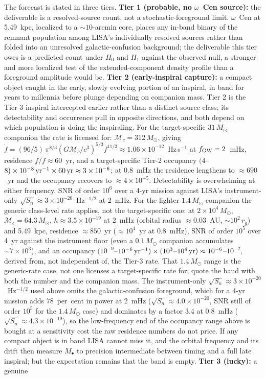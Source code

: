 \documentclass[11pt]{article}
\newcommand{\msun}{\ensuremath{M_\odot}}
\newcommand{\ocen}{\ensuremath{\omega}~Cen}
\begin{document}
The forecast is stated in three tiers. \textbf{Tier 1 (probable, no \ocen{} source):} the deliverable is a resolved-source count, not a stochastic-foreground limit. \ocen{} at 5.49~kpc, localized to a $\sim10$-arcmin core, places any in-band binary of the remnant population among LISA's individually resolved sources rather than folded into an unresolved galactic-confusion background; the deliverable this tier owes is a predicted count under $H_0$ and $H_1$ against the observed null, a stronger and more localized test of the extended-component density profile than a foreground amplitude would be. \textbf{Tier 2 (early-inspiral capture):} a compact object caught in the early, slowly evolving portion of an inspiral, in band for years to millennia before plunge depending on companion mass. Tier 2 is the Tier-3 inspiral intercepted earlier rather than a distinct source class; its detectability and occurrence pull in opposite directions, and both depend on which population is doing the inspiraling. For the target-specific $31\,\msun$ companion the \citet{GonzalezPrieto2025} rate is licensed for: $\mathcal{M}_{c} = 312\,\msun$, giving $\dot f = (96/5)\,\pi^{8/3}(G\mathcal{M}_c/c^3)^{5/3}f^{11/3} \approx 1.06\times10^{-12}$~Hz\,s$^{-1}$ at $f_{\rm GW}=2$~mHz, residence $f/\dot f \approx 60$~yr, and a target-specific Tier-2 occupancy $(4$--$8)\times10^{-8}\,{\rm yr^{-1}} \times 60\,{\rm yr} \approx 3\times10^{-6}$; at $0.8$~mHz the residence lengthens to $\approx 690$~yr and the occupancy recovers to $\approx 4\times10^{-5}$. Detectability is overwhelming at either frequency, SNR of order $10^{6}$ over a 4-yr mission against LISA's instrument-only $\sqrt{S_{n}} \approx 3\times10^{-20}$~Hz$^{-1/2}$ at 2~mHz. For the lighter $1.4\,\msun$ companion the generic class-level rate applies, not the target-specific one: at $2\times10^{4}\,\msun$, $\mathcal{M}_{c}=64.3\,\msun$, $h \approx 3.5\times10^{-19}$ at 2~mHz (orbital radius $\approx 0.03$~AU, $\sim 10^{2}\,r_{g}$) and 5.49~kpc, residence $\approx 850$~yr ($\approx 10^{4}$~yr at 0.8~mHz), SNR of order $10^{5}$ over 4~yr against the instrument floor (even a $0.1\,\msun$ companion accumulates $\sim 7\times10^{3}$), and an occupancy $(10^{-9}$--$10^{-6}\,{\rm yr^{-1}}) \times (10^{3}$--$10^{4}\,{\rm yr}) \approx 10^{-6}$--$10^{-2}$, derived from, not independent of, the Tier-3 rate. That $1.4\,\msun$ range is the generic-rate case, not one \citet{GonzalezPrieto2025} licenses a target-specific rate for; quote the band with both the number and the companion mass. The instrument-only $\sqrt{S_{n}} \approx 3\times10^{-20}$~Hz$^{-1/2}$ used above omits the galactic-confusion foreground, which for a 4-yr mission \citep{Robson2019} adds $78$~per~cent in power at 2~mHz ($\sqrt{S_{n}} \approx 4.0\times10^{-20}$, SNR still of order $10^{5}$ for the $1.4\,\msun$ case) and dominates by a factor $3.4$ at 0.8~mHz ($\sqrt{S_{n}} \approx 4.3\times10^{-19}$), so the low-frequency end of the occupancy range above is bought at a sensitivity cost the raw residence numbers do not price. If any compact object is in band LISA cannot miss it, and the orbital frequency and its drift then measure $M_{\bullet}$ to precision intermediate between timing and a full late inspiral; but the expectation remains that the band is empty. \textbf{Tier 3 (lucky):} a genuine 
\end{document}
